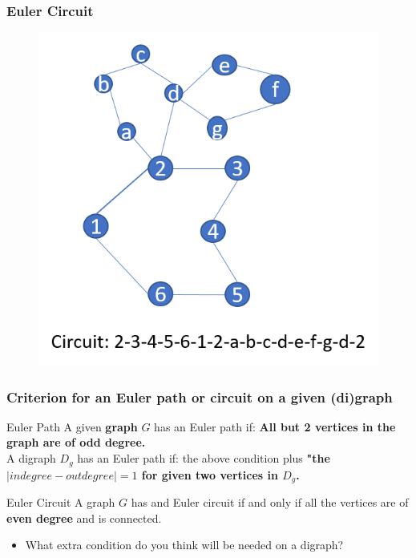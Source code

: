 \documentclass{beamer}
\begin{document}
\begin{frame}
\frametitle{Euler Circuit}
\begin{figure}[h]
\includegraphics[scale = 0.4]{circuit.png}
\end{figure}
\end{frame}



\begin{frame}
\frametitle{Criterion for an Euler path or circuit on a given (di)graph}
\begin{block}{Euler Path}
A given \textbf{graph} $G$ has an Euler path if: \textbf{All but 2 vertices in the graph are of odd degree.}\\ A digraph $D_g$ has an Euler path if: the above condition plus \textbf{"the $|indegree - outdegree| = 1$ for given two vertices in $D_g$.}
\end{block}
\pause
\begin{block}{Euler Circuit}
A graph $G$ has and Euler circuit if and only if all the vertices are of \textbf{even degree} and is connected. 
\end{block}
\pause
\begin{itemize}
\item What extra condition do you think will be needed on a digraph?
\end{itemize}
\end{frame}
\end{document}
